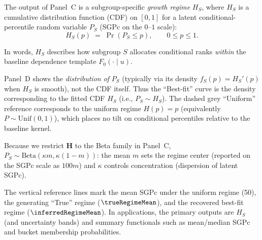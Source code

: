 \documentclass[10pt]{article}
\begin{document}
\noindent
\begin{minipage}[t]{3.75in}
  \vspace{0.05in}
  \hspace{0.15in}%
  \begin{minipage}{3.45in}
    \small\raggedright\color{bodyGrey}

    The output of Panel~C is a subgroup-specific \emph{growth regime} $H_S$, 
    where $H_S$ is a cumulative distribution function (CDF) on $[0,1]$ for a 
    latent conditional-percentile random variable $P_S$ (SGPc on the $0$--$1$ 
    scale):
    \[
      H_S(p)\;=\;\Pr(P_S \le p),\qquad 0\le p\le 1.
    \]
    
    \vspace{1pt}
    In words, $H_S$ describes how subgroup $S$ allocates conditional ranks 
    \emph{within} the baseline dependence template $F_0(\cdot\mid u)$.
    
    \vspace{4pt}
    Panel~D shows the \emph{distribution of} $P_S$ (typically via its density 
    $f_S(p)=H_S'(p)$ when $H_S$ is smooth), not the CDF itself. Thus the ``Best-fit'' 
    curve is the density corresponding to the fitted CDF $H_S$ (i.e., $P_S\sim H_S$).
    The dashed grey ``Uniform'' reference corresponds to the uniform regime $H(p)=p$ 
    (equivalently $P\sim\mathrm{Unif}(0,1)$), which places no tilt on conditional 
    percentiles relative to the baseline kernel.
    
    \vspace{4pt}
    Because we restrict $\mathbold{H}$ to the Beta family in Panel~C, 
    $P_S\sim\mathrm{Beta}(\kappa m,\kappa(1-m))$: the mean $m$ sets the 
    regime center (reported on the SGPc scale as $100m$) and $\kappa$ 
    controls concentration (dispersion of latent SGPc).

    \vspace{4pt}
    The vertical reference lines mark the mean SGPc under the uniform 
    regime (50), the generating ``True'' regime ($\trueRegimeMean$), and the recovered 
    best-fit regime ($\inferredRegimeMean$). In applications, the primary outputs are 
    $H_S$ (and uncertainty bands) and summary functionals such as mean/median 
    SGPc and bucket membership probabilities.

  \end{minipage}
  \vspace{0.1in}
\end{minipage}
\end{document}
